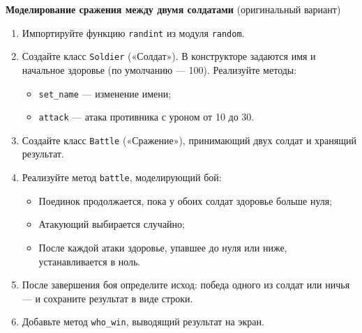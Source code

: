 \item \textbf{Моделирование сражения между двумя солдатами} (оригинальный вариант)

\begin{enumerate}
    \item Импортируйте функцию \texttt{randint} из модуля \texttt{random}.

    \item Создайте класс \texttt{Soldier} («Солдат»).  
    В конструкторе задаются имя и начальное здоровье (по умолчанию — 100).  
    Реализуйте методы:
    \begin{itemize}
        \item \texttt{set\_name} — изменение имени;
        \item \texttt{attack} — атака противника с уроном от 10 до 30.
    \end{itemize}

    \item Создайте класс \texttt{Battle} («Сражение»), принимающий двух солдат и хранящий результат.

    \item Реализуйте метод \texttt{battle}, моделирующий бой:
    \begin{itemize}
        \item Поединок продолжается, пока у обоих солдат здоровье больше нуля;
        \item Атакующий выбирается случайно;
        \item После каждой атаки здоровье, упавшее до нуля или ниже, устанавливается в ноль.
    \end{itemize}

    \item После завершения боя определите исход: победа одного из солдат или ничья — и сохраните результат в виде строки.

    \item Добавьте метод \texttt{who\_win}, выводящий результат на экран.
\end{enumerate}
